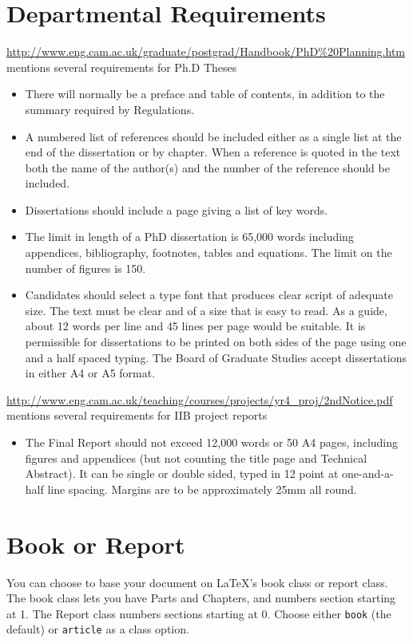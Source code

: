 \documentclass{article}
\begin{document}
\section{Departmental Requirements}
 \url{http://www.eng.cam.ac.uk/graduate/postgrad/Handbook/PhD%20Planning.htm}
mentions several requirements for Ph.D Theses
\begin{itemize}
\item There will normally be a preface and table of contents, in addition to the summary required by Regulations.
\item A numbered list of references should be included either as a single list at the end of the dissertation or by chapter. When a reference is quoted in the text both the name of the author(s) and the number of the reference should be included.
\item Dissertations should include a page giving a list of key words. 
\item The limit in length of a PhD dissertation is 65,000 words including appendices, bibliography, footnotes, tables and equations. The limit on the number of figures is 150.
\item Candidates should select a type font that produces clear script of adequate size. The text must be clear and of a size that is easy to read. As a guide, about 12 words per line and 45 lines per page would be suitable. It is permissible for dissertations to be printed on both sides of the page using one and a half spaced typing. The Board of Graduate Studies accept dissertations in either A4 or A5 format. 
\end{itemize}

\noindent\url{http://www.eng.cam.ac.uk/teaching/courses/projects/yr4_proj/2ndNotice.pdf}
mentions several requirements for IIB project reports
\begin{itemize}
\item The Final Report should not exceed 12,000 words or 50 A4 pages, including figures and appendices (but not counting the title page and Technical Abstract). It can be single or double sided, typed in 12 point at one-and-a-half line spacing. Margins are to be approximately 25mm all round.
\end{itemize}
\section{Book or Report}
You can choose to base your document on LaTeX's book class or report
class. The book class lets you have Parts and Chapters, and numbers 
section starting at 1. The Report class numbers sections starting at 0.
Choose either \texttt{book} (the default) or  \texttt{article} as a 
class option.
\end{document}
